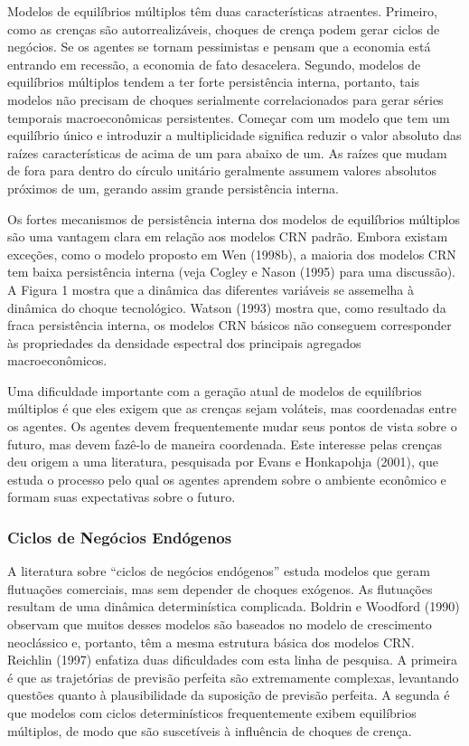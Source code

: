 \documentclass[12pt]{article}
\begin{document}
Modelos de equilíbrios múltiplos têm duas características atraentes. Primeiro, como as crenças são autorrealizáveis, choques de crença podem gerar ciclos de negócios. Se os agentes se tornam pessimistas e pensam que a economia está entrando em recessão, a economia de fato desacelera. Segundo, modelos de equilíbrios múltiplos tendem a ter forte persistência interna, portanto, tais modelos não precisam de choques serialmente correlacionados para gerar séries temporais macroeconômicas persistentes. Começar com um modelo que tem um equilíbrio único e introduzir a multiplicidade significa reduzir o valor absoluto das raízes características de acima de um para abaixo de um. As raízes que mudam de fora para dentro do círculo unitário geralmente assumem valores absolutos próximos de um, gerando assim grande persistência interna.

Os fortes mecanismos de persistência interna dos modelos de equilíbrios múltiplos são uma vantagem clara em relação aos modelos CRN padrão. Embora existam exceções, como o modelo proposto em Wen (1998b), a maioria dos modelos CRN tem baixa persistência interna (veja Cogley e Nason (1995) para uma discussão). A Figura 1 mostra que a dinâmica das diferentes variáveis se assemelha à dinâmica do choque tecnológico. Watson (1993) mostra que, como resultado da fraca persistência interna, os modelos CRN básicos não conseguem corresponder às propriedades da densidade espectral dos principais agregados macroeconômicos.

Uma dificuldade importante com a geração atual de modelos de equilíbrios múltiplos é que eles exigem que as crenças sejam voláteis, mas coordenadas entre os agentes. Os agentes devem frequentemente mudar seus pontos de vista sobre o futuro, mas devem fazê-lo de maneira coordenada. Este interesse pelas crenças deu origem a uma literatura, pesquisada por Evans e Honkapohja (2001), que estuda o processo pelo qual os agentes aprendem sobre o ambiente econômico e formam suas expectativas sobre o futuro.

\subsubsection*{Ciclos de Negócios Endógenos}

A literatura sobre “ciclos de negócios endógenos” estuda modelos que geram flutuações comerciais, mas sem depender de choques exógenos. As flutuações resultam de uma dinâmica determinística complicada. Boldrin e Woodford (1990) observam que muitos desses modelos são baseados no modelo de crescimento neoclássico e, portanto, têm a mesma estrutura básica dos modelos CRN. Reichlin (1997) enfatiza duas dificuldades com esta linha de pesquisa. A primeira é que as trajetórias de previsão perfeita são extremamente complexas, levantando questões quanto à plausibilidade da suposição de previsão perfeita. A segunda é que modelos com ciclos determinísticos frequentemente exibem equilíbrios múltiplos, de modo que são suscetíveis à influência de choques de crença.
\end{document}
